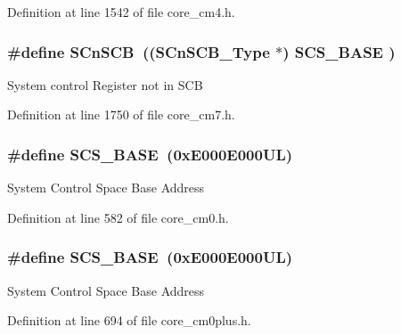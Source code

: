 Definition at line 1542 of file core\+\_\+cm4.\+h.

\subsubsection[{\texorpdfstring{S\+Cn\+S\+CB}{SCnSCB}}]{\setlength{\rightskip}{0pt plus 5cm}\#define S\+Cn\+S\+CB~(({\bf S\+Cn\+S\+C\+B\+\_\+\+Type}    $\ast$)     {\bf S\+C\+S\+\_\+\+B\+A\+SE}      )}\hypertarget{group___c_m_s_i_s__core__base_ga9fe0cd2eef83a8adad94490d9ecca63f}{}\label{group___c_m_s_i_s__core__base_ga9fe0cd2eef83a8adad94490d9ecca63f}
System control Register not in S\+CB 

Definition at line 1750 of file core\+\_\+cm7.\+h.

\subsubsection[{\texorpdfstring{S\+C\+S\+\_\+\+B\+A\+SE}{SCS_BASE}}]{\setlength{\rightskip}{0pt plus 5cm}\#define S\+C\+S\+\_\+\+B\+A\+SE~(0x\+E000\+E000\+U\+L)}\hypertarget{group___c_m_s_i_s__core__base_ga3c14ed93192c8d9143322bbf77ebf770}{}\label{group___c_m_s_i_s__core__base_ga3c14ed93192c8d9143322bbf77ebf770}
System Control Space Base Address 

Definition at line 582 of file core\+\_\+cm0.\+h.

\subsubsection[{\texorpdfstring{S\+C\+S\+\_\+\+B\+A\+SE}{SCS_BASE}}]{\setlength{\rightskip}{0pt plus 5cm}\#define S\+C\+S\+\_\+\+B\+A\+SE~(0x\+E000\+E000\+U\+L)}\hypertarget{group___c_m_s_i_s__core__base_ga3c14ed93192c8d9143322bbf77ebf770}{}\label{group___c_m_s_i_s__core__base_ga3c14ed93192c8d9143322bbf77ebf770}
System Control Space Base Address 

Definition at line 694 of file core\+\_\+cm0plus.\+h.

